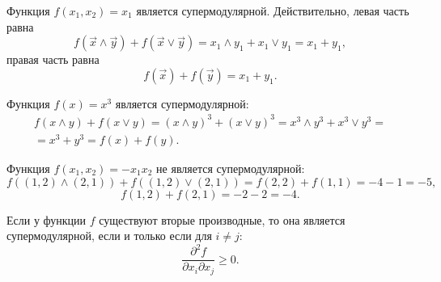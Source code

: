 \begin{myex} Функция $ f(x_{1},x_{2})=x_{1} $ является супермодулярной. Действительно, левая часть равна
\begin{equation}
f(\vec{x}\wedge\vec{y})+f(\vec{x}\vee\vec{y})=x_{1}\wedge y_{1}+x_{1}\vee y_{1}=x_{1}+y_{1},
\end{equation}
правая часть равна
\begin{equation}
f(\vec{x})+f(\vec{y})=x_{1}+y_{1}.
\end{equation}
\end{myex}

\begin{myex} Функция $ f(x)=x^{3} $ является супермодулярной:
\begin{multline}
f(x\wedge y)+f(x \vee y)=(x\wedge y)^{3}+(x\vee y)^{3}=x^{3}\wedge y^{3} + x^{3}\vee y^{3}=\\
=x^{3}+y^{3}=f(x)+f(y).
\end{multline}
\end{myex}

\begin{myex} Функция $ f(x_{1},x_{2})=-x_{1}x_{2} $ не является супермодулярной:
\begin{equation}
f((1,2)\wedge (2,1))+f((1,2)\vee (2,1))=f(2,2)+f(1,1)=-4-1=-5,
\end{equation}
\begin{equation}
f(1,2)+f(2,1)=-2-2=-4.
\end{equation}


\end{myex}




\begin{myth} Если у функции $ f $ существуют вторые производные, то она является супермодулярной, если и только если для $ i\neq j $:
\label{supermod_crit} 
\begin{equation}
\frac{\partial^{2}f}{\partial x_{i}\partial x_{j}}\geq 0.
\end{equation}
\end{myth}


